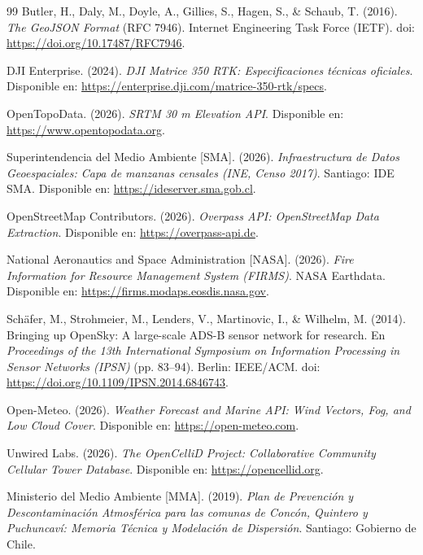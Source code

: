 \documentclass[letterpaper,12pt]{article}
\begin{document}
\begin{thebibliography}{99}
 Butler, H., Daly, M., Doyle, A., Gillies, S., Hagen, S., \& Schaub, T. (2016). \textit{The GeoJSON Format} (RFC 7946). Internet Engineering Task Force (IETF). doi: \url{https://doi.org/10.17487/RFC7946}.

 DJI Enterprise. (2024). \textit{DJI Matrice 350 RTK: Especificaciones técnicas oficiales}. Disponible en: \url{https://enterprise.dji.com/matrice-350-rtk/specs}.

 OpenTopoData. (2026). \textit{SRTM 30 m Elevation API}. Disponible en: \url{https://www.opentopodata.org}.

 Superintendencia del Medio Ambiente [SMA]. (2026). \textit{Infraestructura de Datos Geoespaciales: Capa de manzanas censales (INE, Censo 2017)}. Santiago: IDE SMA. Disponible en: \url{https://ideserver.sma.gob.cl}.

 OpenStreetMap Contributors. (2026). \textit{Overpass API: OpenStreetMap Data Extraction}. Disponible en: \url{https://overpass-api.de}.

 National Aeronautics and Space Administration [NASA]. (2026). \textit{Fire Information for Resource Management System (FIRMS)}. NASA Earthdata. Disponible en: \url{https://firms.modaps.eosdis.nasa.gov}.

 Schäfer, M., Strohmeier, M., Lenders, V., Martinovic, I., \& Wilhelm, M. (2014). Bringing up OpenSky: A large-scale ADS-B sensor network for research. En \textit{Proceedings of the 13th International Symposium on Information Processing in Sensor Networks (IPSN)} (pp. 83--94). Berlin: IEEE/ACM. doi: \url{https://doi.org/10.1109/IPSN.2014.6846743}.

 Open-Meteo. (2026). \textit{Weather Forecast and Marine API: Wind Vectors, Fog, and Low Cloud Cover}. Disponible en: \url{https://open-meteo.com}.

 Unwired Labs. (2026). \textit{The OpenCelliD Project: Collaborative Community Cellular Tower Database}. Disponible en: \url{https://opencellid.org}.

 Ministerio del Medio Ambiente [MMA]. (2019). \textit{Plan de Prevención y Descontaminación Atmosférica para las comunas de Concón, Quintero y Puchuncaví: Memoria Técnica y Modelación de Dispersión}. Santiago: Gobierno de Chile.

\end{thebibliography}
\end{document}
